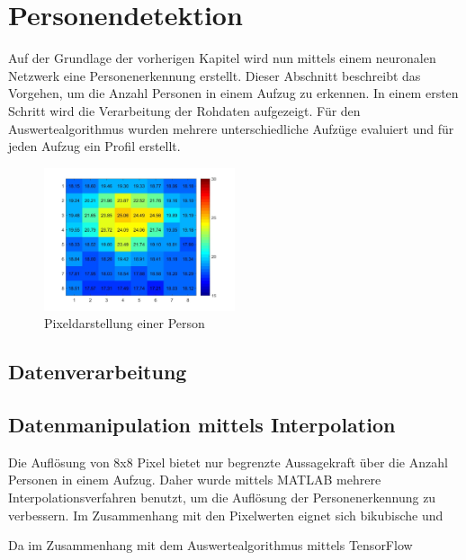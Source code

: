 \chapter{Personendetektion}
\label{chap:Personendetektion}

Auf der Grundlage der vorherigen Kapitel wird nun mittels einem neuronalen Netzwerk eine Personenerkennung erstellt. Dieser Abschnitt beschreibt das Vorgehen, um die Anzahl Personen in einem Aufzug zu erkennen. In einem ersten Schritt wird die Verarbeitung der Rohdaten aufgezeigt. Für den Auswertealgorithmus wurden mehrere unterschiedliche Aufzüge evaluiert und für jeden Aufzug ein Profil erstellt. 



\begin{figure}[H]
	\centering
	\includegraphics[width=0.5\textwidth]
	{fig/person_175_shirt.jpg}
	\caption[Pixeldarstellung einer Person]{Pixeldarstellung einer Person}
	\label{fig:Pixelbild}
\end{figure}



\section{Datenverarbeitung}




\section{Datenmanipulation mittels Interpolation}

Die Auflösung von 8x8 Pixel bietet nur begrenzte Aussagekraft über die Anzahl Personen in einem Aufzug. Daher wurde mittels MATLAB mehrere Interpolationsverfahren benutzt, um die Auflösung der Personenerkennung zu verbessern. Im Zusammenhang mit den Pixelwerten eignet sich bikubische und 



Da im Zusammenhang mit dem Auswertealgorithmus mittels TensorFlow





